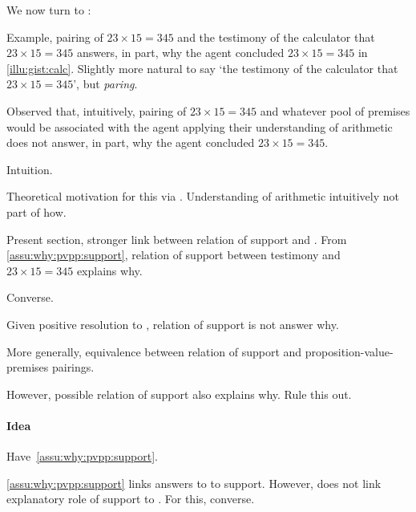 \begin{note}[Introduction]
  We now turn to \qWhy{}:
  \vspace{-\baselineskip}
  \begin{quote}
    \questionWhyBasic*
  \end{quote}
  Example, pairing of \(23 \times 15 = 345\) and the testimony of the calculator that \(23 \times 15 = 345\) answers, in part, why the agent concluded \(23 \times 15 = 345\) in \autoref{illu:gist:calc}.
  Slightly more natural to say `the testimony of the calculator that \(23 \times 15 = 345\)', but \emph{paring}.

  Observed that, intuitively, pairing of \(23 \times 15 = 345\) and whatever pool of premises would be associated with the agent applying their understanding of arithmetic does not answer, in part, why the agent concluded \(23 \times 15 = 345\).
\end{note}

\begin{note}
  Intuition.

  Theoretical motivation for this via \issueInclusion{}.
  Understanding of arithmetic intuitively not part of how.
\end{note}

\begin{note}
  Present section, stronger link between relation of support and \qWhy{}.
  From \autoref{assu:why:pvpp:support}, relation of support between testimony and \(23 \times 15 = 345\) explains why.

  Converse.

  Given positive resolution to \issueInclusion{}, relation of support is not answer why.

  More generally, equivalence between relation of support and proposition-value-premises pairings.


  However, possible relation of support also explains why.
  Rule this out.
\end{note}

\paragraph{Idea}
\label{sec:clar:expand:qWhy:idea}

\begin{note}
  Have~\autoref{assu:why:pvpp:support}.

  \autoref{assu:why:pvpp:support} links answers to \qWhy{} to support.
  However, does not link explanatory role of support to \qWhy{}.
  For this, converse.
\end{note}

